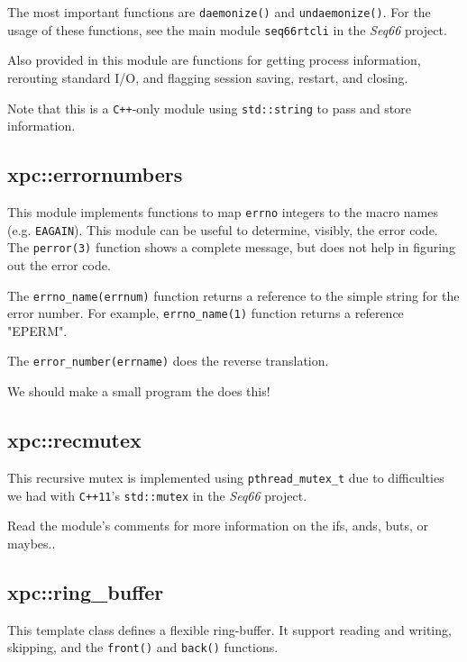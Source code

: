    The most important functions are
   \texttt{daemonize()} and
   \texttt{undaemonize()}.
   For the usage of these functions, see the main module
   \texttt{seq66rtcli} in the \textsl{Seq66} project.

   Also provided in this module are functions for getting process information,
   rerouting standard I/O, and flagging session saving, restart, and closing.

   Note that this is a \texttt{C++}-only module using
   \texttt{std::string} to pass and store information.

\subsection{xpc::errornumbers}
\label{subsec:xpc_namespace_errornumbers}

   This module implements functions to map \texttt{errno} integers
   to the macro names (e.g. \texttt{EAGAIN}).
   This module can be useful to determine, visibly, the error code.
   The \texttt{perror(3)} function shows a complete message, but
   does not help in figuring out the error code.

   The \texttt{errno\_name(errnum)} function returns a reference
   to the simple string for the error number. For example,
   \texttt{errno\_name(1)} function returns a reference "EPERM".

   The \texttt{error\_number(errname)} does the reverse translation.

   We should make a small program the does this!

\subsection{xpc::recmutex}
\label{subsec:xpc_namespace_recmutex}

   This recursive mutex is implemented using
   \texttt{pthread\_mutex\_t} due to difficulties we had
   with \texttt{C++11}'s \texttt{std::mutex} in the \textsl{Seq66} project.

   Read the module's comments for more information on the ifs, ands, buts, or
   maybes..

\subsection{xpc::ring\_buffer}
\label{subsec:xpc_namespace_ring_buffer}

   This template class defines a flexible ring-buffer.
   It support reading and writing, skipping, and the
   \texttt{front()} and
   \texttt{back()} functions.

